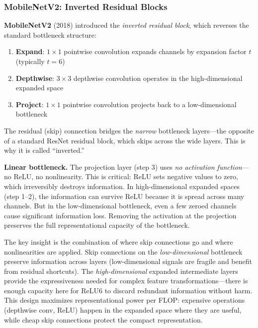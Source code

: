 \subsubsection*{MobileNetV2: Inverted Residual Blocks}

\textbf{MobileNetV2} (2018) introduced the \textit{inverted residual block}, which reverses the standard bottleneck structure:
\begin{enumerate}
    \item \textbf{Expand}: $1 \times 1$ pointwise convolution expands channels by expansion factor $t$ (typically $t = 6$)
    \item \textbf{Depthwise}: $3 \times 3$ depthwise convolution operates in the high-dimensional expanded space
    \item \textbf{Project}: $1 \times 1$ pointwise convolution projects back to a low-dimensional bottleneck
\end{enumerate}
The residual (skip) connection bridges the \textit{narrow} bottleneck layers---the opposite of a standard ResNet residual block, which skips across the wide layers. This is why it is called ``inverted.''

\textbf{Linear bottleneck.} The projection layer (step 3) uses \textit{no activation function}---no ReLU, no nonlinearity. This is critical: ReLU sets negative values to zero, which irreversibly destroys information. In high-dimensional expanded spaces (step 1--2), the information can survive ReLU because it is spread across many channels. But in the low-dimensional bottleneck, even a few zeroed channels cause significant information loss. Removing the activation at the projection preserves the full representational capacity of the bottleneck.

\begin{keyinsight}
The key insight is the combination of where skip connections go and where nonlinearities are applied. Skip connections on the \textit{low-dimensional} bottleneck preserve information across layers (low-dimensional signals are fragile and benefit from residual shortcuts). The \textit{high-dimensional} expanded intermediate layers provide the expressiveness needed for complex feature transformations---there is enough capacity here for ReLU6 to discard redundant information without harm. This design maximizes representational power per FLOP: expensive operations (depthwise conv, ReLU) happen in the expanded space where they are useful, while cheap skip connections protect the compact representation.
\end{keyinsight}

